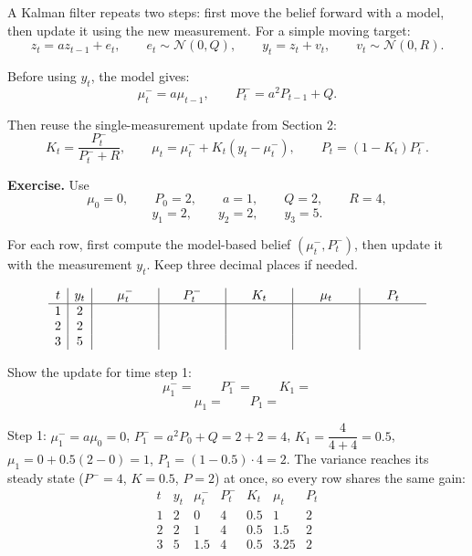 \documentclass[11pt]{article}
\begin{document}
A Kalman filter repeats two steps: first move the belief forward with a model,
then update it using the new measurement. For a simple moving target:
\[
z_t = az_{t-1}+e_t,
\qquad
e_t\sim\mathcal{N}(0,Q),
\qquad
y_t=z_t+v_t,
\qquad
v_t\sim\mathcal{N}(0,R).
\]

Before using $y_t$, the model gives:
\[
\mu_t^-=a\mu_{t-1},
\qquad
P_t^-=a^2P_{t-1}+Q.
\]

Then reuse the single-measurement update from Section 2:
\[
K_t=\frac{P_t^-}{P_t^-+R},
\qquad
\mu_t=\mu_t^-+K_t(y_t-\mu_t^-),
\qquad
P_t=(1-K_t)P_t^-.
\]

\textbf{Exercise.} Use
\[
\mu_0=0,\qquad P_0=2,\qquad a=1,\qquad Q=2,\qquad R=4,
\]
\[
y_1=2,\qquad y_2=2,\qquad y_3=5.
\]

For each row, first compute the model-based belief $(\mu_t^-,P_t^-)$, then
update it with the measurement $y_t$. Keep three decimal places if needed.

{\renewcommand{\arraystretch}{2.25}
\[
\begin{array}{c|c|c|c|c|c|c}
t & y_t & \mu_t^- & P_t^- & K_t & \mu_t & P_t \\
\hline
1 & 2 & \hspace{4.2em} & \hspace{4.2em} & \hspace{4.2em} &
\hspace{4.2em} & \hspace{4.2em} \\
2 & 2 & & & & & \\
3 & 5 & & & & &
\end{array}
\]
}

\vspace{2.0em}

Show the update for time step 1:
\[
\mu_1^-=
\qquad
P_1^-=
\qquad
K_1=
\]
\[
\mu_1=
\qquad
P_1=
\]

\vspace{2.5em}

\begin{solution}
Step 1: $\mu_1^-=a\mu_0=0$, $P_1^-=a^2P_0+Q=2+2=4$,
$K_1=\dfrac{4}{4+4}=0.5$, $\mu_1=0+0.5(2-0)=1$, $P_1=(1-0.5)\cdot4=2$.
The variance reaches its steady state ($P^-=4$, $K=0.5$, $P=2$) at once, so
every row shares the same gain:
\[
\begin{array}{c|c|c|c|c|c|c}
t & y_t & \mu_t^- & P_t^- & K_t & \mu_t & P_t \\
\hline
1 & 2 & 0    & 4 & 0.5 & 1    & 2 \\
2 & 2 & 1    & 4 & 0.5 & 1.5  & 2 \\
3 & 5 & 1.5  & 4 & 0.5 & 3.25 & 2
\end{array}
\]
\end{solution}
\end{document}
